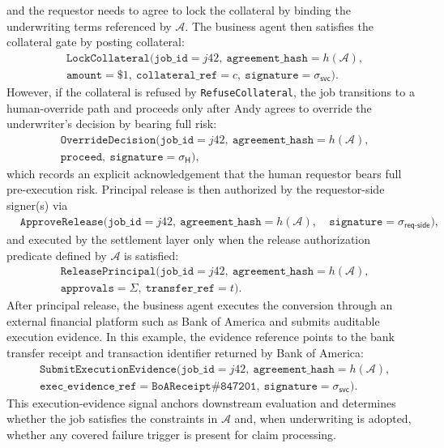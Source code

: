 \documentclass{article} %
\begin{document}
and the requestor needs to agree to lock the collateral by binding the underwriting terms referenced by $\mathcal{A}$. The business agent then satisfies the collateral gate by posting collateral:
\[
\begin{aligned}
&\texttt{LockCollateral}(\texttt{job\_id}=j42,\ \texttt{agreement\_hash}=h(\mathcal{A}),\\ 
&\texttt{amount}=\$1,\ \texttt{collateral\_ref}=c,\ \texttt{signature}=\sigma_{\textsf{svc}}).
\end{aligned}
\]
However, if the collateral is refused by \texttt{RefuseCollateral}, the job transitions to a human-override path and proceeds only after Andy agrees to override the underwriter's decision by bearing full risk:
\[
\begin{aligned}
&\texttt{OverrideDecision}(\texttt{job\_id}=j42,\ \texttt{agreement\_hash}=h(\mathcal{A}),\\ 
&\texttt{proceed},\ \texttt{signature}=\sigma_{\textsf{H}}),
\end{aligned}
\]
which records an explicit acknowledgement that the human requestor bears full pre-execution risk. Principal release is then authorized by the requestor-side signer(s) via
\[
\begin{aligned}
&\texttt{ApproveRelease}(\texttt{job\_id}=j42,\ \texttt{agreement\_hash}=h(\mathcal{A}),\ 
&\texttt{signature}=\sigma_{\textsf{req-side}}),
\end{aligned}
\]
and executed by the settlement layer only when the release authorization predicate defined by $\mathcal{A}$ is satisfied:
\[
\begin{aligned}
&\texttt{ReleasePrincipal}(\texttt{job\_id}=j42,\ \texttt{agreement\_hash}=h(\mathcal{A}),\\ 
&\texttt{approvals}=\Sigma,\ \texttt{transfer\_ref}=t).
\end{aligned}
\]
After principal release, the business agent executes the conversion through an external financial platform such as Bank of America and submits auditable execution evidence. In this example, the evidence reference points to the bank transfer receipt and transaction identifier returned by Bank of America:
\[
\begin{aligned}
&\texttt{SubmitExecutionEvidence}(\texttt{job\_id}=j42,\ \texttt{agreement\_hash}=h(\mathcal{A}),\\ 
&\texttt{exec\_evidence\_ref}=\texttt{BoAReceipt\#847201},\ 
\texttt{signature}=\sigma_{\textsf{svc}}).
\end{aligned}
\]
This execution-evidence signal anchors downstream evaluation and determines whether the job satisfies the constraints in $\mathcal{A}$ and, when underwriting is adopted, whether any covered failure trigger is present for claim processing.
\end{document}
